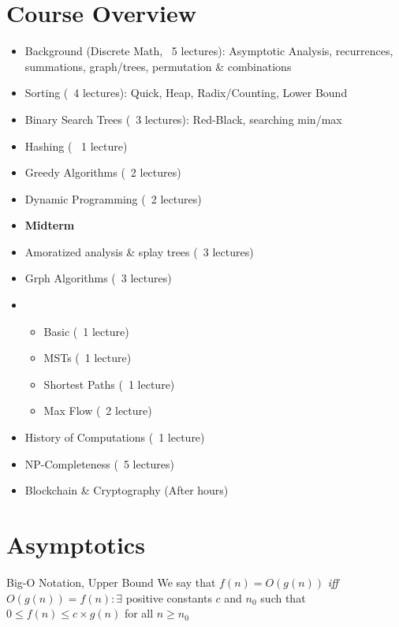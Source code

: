 \section{Course Overview}
\begin{itemize}
    \item Background (Discrete Math, ~5 lectures): Asymptotic Analysis, recurrences, summations, graph/trees, permutation \& combinations
    \item Sorting (~4 lectures): Quick, Heap, Radix/Counting, Lower Bound
    \item Binary Search Trees (~3 lectures): Red-Black, searching min/max
    \item Hashing (~ 1 lecture)
    \item Greedy Algorithms (~2 lectures)
    \item Dynamic Programming (~2 lectures)
    \item \textbf{Midterm}
    \item Amoratized analysis \& splay trees (~3 lectures)
    \item Grph Algorithms (~3 lectures)
    \item \begin{itemize}
        \item Basic (~1 lecture)
        \item MSTs (~1 lecture)
        \item Shortest Paths (~1 lecture)
        \item Max Flow (~2 lecture)
    \end{itemize}
    \item History of Computations (~1 lecture)
    \item NP-Completeness (~5 lectures)
    \item Blockchain \& Cryptography (After hours)
\end{itemize}

\section{Asymptotics}
\begin{definition}
    {Big-O Notation, Upper Bound}
    We say that $f(n) = O(g(n))$ \textit{iff} $O(g(n)) = f(n): \exists$ positive constants $c$ and $n_0$ such that $0 \leq f(n) \leq c\times g(n)$ for all $n \geq n_0$
\end{definition}
\begin{figure}[H]
    \centering
\end{figure}


